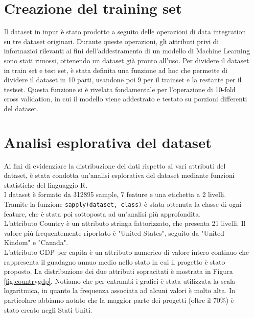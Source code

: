\section{Creazione del training set}
Il dataset in input è stato prodotto a seguito delle operazioni di data integration su tre dataset originari. Durante queste operazioni, gli attributi privi di informazioi rilevanti ai fini dell'addestramento di un modello di Machine Learning sono stati rimossi, ottenendo un dataset già pronto all'uso. Per dividere il dataset in train set e test set, è stata definita una funzione ad hoc che permette di dividere il dataset in 10 parti, usandone poi 9 per il trainset e la restante per il testset. Questa funzione si è rivelata fondamentale per l'operazione di 10-fold cross validation, in cui il modello viene addestrato e testato su porzioni differenti del dataset.

\section{Analisi esplorativa del dataset}
Ai fini di evidenziare la distribuzione dei dati rispetto ai vari attributi del dataset, è stata condotta un'analisi esplorativa del dataset mediante funzioni statistiche del linguaggio R.\\
I dataset è formato da 312895 sample, 7 feature e una etichetta a 2 livelli.
Tramite la funzione \texttt{sapply(dataset, class)} è stata ottenuta la classe di ogni feature, che è stata poi sottoposta ad un'analisi più approfondita.\\
L'attributo Country è un attributo stringa fattorizzato, che presenta 21 livelli. Il valore più frequentemente riportato è "United States", seguito da "United Kindom" e "Canada".\\
L'attributo GDP per capita è un attributo numerico di valore intero continuo che rappresenta il guadagno annuo medio nello stato in cui il progetto è stato proposto. La distribuzione dei due attributi sopracitati è mostrata in Figura \ref{fig:countrygdp}. Notiamo che per entrambi i grafici è stata utilizzata la scala logaritmica, in quanto la frequenza associata ad alcuni valori è molto alta. In particolare abbiamo notato che la maggior parte dei progetti (oltre il 70\%) è stato creato negli Stati Uniti.

